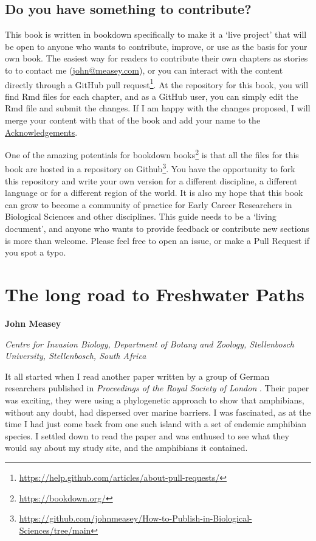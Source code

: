 \documentclass[
]{krantz}
\renewcommand{\href}[2]{#2\footnote{\url{#1}}}
\begin{document}
\hypertarget{contribute}{%
\section*{Do you have something to contribute?}\label{contribute}}


This book is written in bookdown \citep{xie2016bookdown} specifically to make it a `live project' that will be open to anyone who wants to contribute, improve, or use as the basis for your own book. The easiest way for readers to contribute their own chapters as stories to to contact me (\url{john@measey.com}), or you can interact with the content directly through a \href{https://help.github.com/articles/about-pull-requests/}{GitHub pull request}. At the repository for this book, you will find Rmd files for each chapter, and as a GitHub user, you can simply edit the Rmd file and submit the changes. If I am happy with the changes proposed, I will merge your content with that of the book and add your name to the \protect\hyperlink{acknowledge}{Acknowledgements}.

One of the amazing potentials for \href{https://bookdown.org/}{bookdown books} is that all the files for this book are hosted in a repository on \href{https://github.com/johnmeasey/How-to-Publish-in-Biological-Sciences/tree/main}{Github}. You have the opportunity to fork this repository and write your own version for a different discipline, a different language or for a different region of the world. It is also my hope that this book can grow to become a community of practice for Early Career Researchers in Biological Sciences and other disciplines. This guide needs to be a `living document', and anyone who wants to provide feedback or contribute new sections is more than welcome. Please feel free to open an issue, or make a Pull Request if you spot a typo.

\mainmatter

\hypertarget{the-long-road-to-freshwater-paths}{%
\chapter{The long road to Freshwater Paths}\label{the-long-road-to-freshwater-paths}}

\textbf{John Measey}

\emph{Centre for Invasion Biology, Department of Botany and Zoology, Stellenbosch University, Stellenbosch, South Africa}

It all started when I read another paper written by a group of German researchers published in \emph{Proceedings of the Royal Society of London} \citep{vences2003multiple}. Their paper was exciting, they were using a phylogenetic approach to show that amphibians, without any doubt, had dispersed over marine barriers. I was fascinated, as at the time I had just come back from one such island with a set of endemic amphibian species. I settled down to read the paper and was enthused to see what they would say about my study site, and the amphibians it contained.
\end{document}
